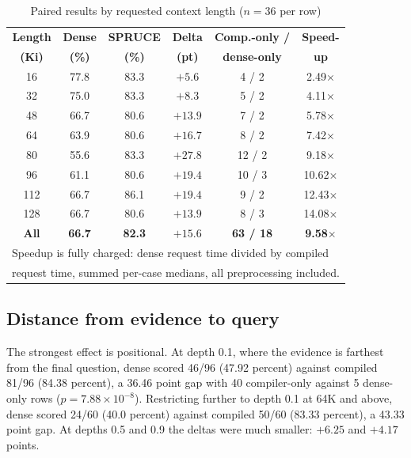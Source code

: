 \documentclass[conference]{IEEEtran}
\begin{document}
\begin{table}[t]
\caption{Paired results by requested context length ($n=36$ per row)}
\begin{center}
\renewcommand{\arraystretch}{1.05}
\begin{tabular}{|c|c|c|c|c|c|}
\hline
\textbf{Length} & \textbf{Dense} & \textbf{SPRUCE} & \textbf{Delta} & \textbf{Comp.-only /} & \textbf{Speed-} \\
\textbf{(Ki)} & \textbf{(\%)} & \textbf{(\%)} & \textbf{(pt)} & \textbf{dense-only} & \textbf{up} \\
\hline
16  & 77.8 & 83.3 & $+5.6$  & 4 / 2  & 2.49$\times$ \\
32  & 75.0 & 83.3 & $+8.3$  & 5 / 2  & 4.11$\times$ \\
48  & 66.7 & 80.6 & $+13.9$ & 7 / 2  & 5.78$\times$ \\
64  & 63.9 & 80.6 & $+16.7$ & 8 / 2  & 7.42$\times$ \\
80  & 55.6 & 83.3 & $+27.8$ & 12 / 2 & 9.18$\times$ \\
96  & 61.1 & 80.6 & $+19.4$ & 10 / 3 & 10.62$\times$ \\
112 & 66.7 & 86.1 & $+19.4$ & 9 / 2  & 12.43$\times$ \\
128 & 66.7 & 80.6 & $+13.9$ & 8 / 3  & 14.08$\times$ \\
\hline
\textbf{All} & \textbf{66.7} & \textbf{82.3} & $\mathbf{+15.6}$ & \textbf{63 / 18} & \textbf{9.58}$\boldsymbol{\times}$ \\
\hline
\multicolumn{6}{l}{Speedup is fully charged: dense request time divided by compiled}\\
\multicolumn{6}{l}{request time, summed per-case medians, all preprocessing included.}
\end{tabular}
\label{tab2}
\end{center}
\end{table}

\subsection{Distance from evidence to query}

The strongest effect is positional. At depth 0.1, where the evidence is farthest
from the final question, dense
scored 46/96 (47.92 percent) against compiled 81/96 (84.38 percent), a 36.46 point
gap with 40 compiler-only against 5 dense-only rows ($p=7.88\times10^{-8}$).
Restricting further to depth 0.1 at 64K and above, dense scored 24/60
(40.0 percent) against compiled 50/60 (83.33 percent), a 43.33 point gap. At depths
0.5 and 0.9 the deltas were much smaller: $+6.25$ and $+4.17$ points.
\end{document}
